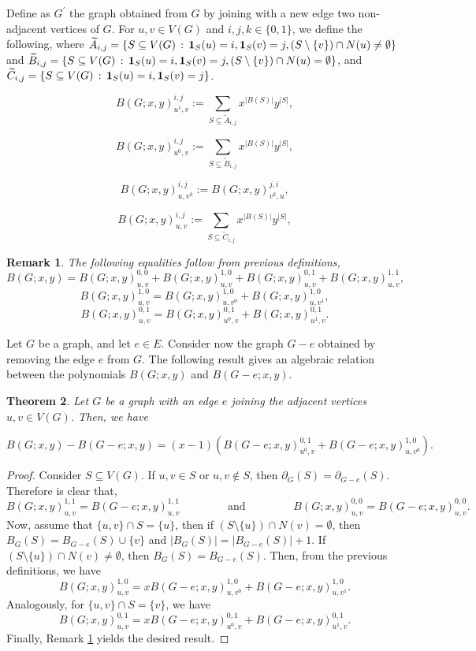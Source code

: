 \documentclass[review]{elsarticle}
\newtheorem{theorem}{Theorem}[section]
\newtheorem{remark}[theorem]{Remark}
\begin{document}
Define as $G^{\prime}$ the graph obtained from $G$ by joining with a new edge two non-adjacent vertices of $G$. For $u,v \in V(G)$ and $i,j,k \in \{0,1\}$, we define the following, where $\widetilde{A}_{i,j} = \{S\subseteq V(G)\,:\,{\bf 1}_{S}(u)=i,{\bf 1}_{S}(v)=j,(S\setminus \{v\})\cap N(u) \not= \emptyset\}$ and $\widetilde{B}_{i,j} = \{S\subseteq V(G)\,:\,{\bf 1}_{S}(u)=i,{\bf 1}_{S}(v)=j,(S\setminus \{v\})\cap N(u) = \emptyset\}$, and $\widetilde{C}_{i,j} = \{S\subseteq V(G)\,:\,{\bf 1}_{S}(u)=i,{\bf 1}_{S}(v)=j\}$.

$$B(G;x,y)_{u^{1},v}^{i,j} := \sum_{S\subseteq\widetilde{A}_{i,j}}x^{|B(S)|} y^{|S|},$$

$$B(G;x,y)_{u^{0},v}^{i,j} := \sum_{S\subseteq\widetilde{B}_{i,j}}x^{|B(S)|}y^{|S|},$$

$$B(G;x,y)_{u,v^{k}}^{i,j} := B(G;x,y)_{v^{k},u}^{j,i},$$

$$B(G;x,y)_{u,v}^{i,j} := \sum_{S\subseteq\widetilde{C}_{i,j}}x^{|B(S)|} y^{|S|},$$

\begin{remark}\label{re:1}
    The following equalities follow from previous definitions,
    $$B(G;x,y) = B(G;x,y)_{u,v}^{0,0} + B(G;x,y)_{u,v}^{1,0} + B(G;x,y)_{u,v}^{0,1} + B(G;x,y)_{u,v}^{1,1},$$
    $$B(G;x,y)_{u,v}^{1,0} = B(G;x,y)_{u,v^{0}}^{1,0} + B(G;x,y)_{u,v^{1}}^{1,0},$$
    $$B(G;x,y)_{u,v}^{0,1} = B(G;x,y)_{u^{0},v}^{0,1}+B(G;x,y)_{u^{1},v}^{0,1}.$$
\end{remark}

Let $G$ be a graph, and let $e\in E$. Consider now the graph $G-e$ obtained by removing the edge $e$ from $G$. The following result gives an algebraic relation between the polynomials $B(G;x,y)$ and $B(G-e;x,y)$.

\begin{theorem}\label{th:G+e}
    Let $G$ be a graph with an edge $e$ joining the adjacent vertices $u,v\in V(G)$. Then, we have

    \begin{equation}\label{eq:G+e}
        B(G;x,y)-B(G-e;x,y)= (x-1) \left( B(G-e;x,y)^{0,1}_{u^{0},v} + B(G-e;x,y)^{1,0}_{u,v^{0}}
 \right).
    \end{equation}
\end{theorem}

\begin{proof}
    Consider $S \subseteq V(G)$. If $u,v \in S$ or $u,v \not\in S$, then $\partial_{G}(S) = \partial_{G-e}(S)$. Therefore is clear that,
    $$B(G;x,y)_{u,v}^{1,1} = B(G-e;x,y)_{u,v}^{1,1} \qquad\qquad \text{ and } \qquad\qquad  B(G;x,y)_{u,v}^{0,0} = B(G-e;x,y)_{u,v}^{0,0}.$$
    Now, assume that $\{u,v\}\cap S = \{u\}$, then if $(S\setminus\{u\})\cap N(v) = \emptyset$, then $B_{G}(S) = B_{G-e}(S)\cup\{v\}$ and $|B_{G}(S)| = |B_{G-e}(S)|+1$. If $(S\setminus \{u\})\cap N(v) \not= \emptyset$, then $B_{G}(S) = B_{G-e}(S)$. Then, from the previous definitions, we have
    $$B(G;x,y)_{u,v}^{1,0} = xB(G-e;x,y)_{u,v^{0}}^{1,0}+B(G-e;x,y)_{u,v^{1}}^{1,0}.$$
    Analogously, for $\{u,v\}\cap S = \{v\}$, we have
    $$B(G;x,y)_{u,v}^{0,1} = xB(G-e;x,y)_{u^{0},v}^{0,1}+B(G-e;x,y)_{u^{1},v}^{0,1}.$$
    Finally, Remark \ref{re:1} yields the desired result.
\end{proof}
\end{document}
